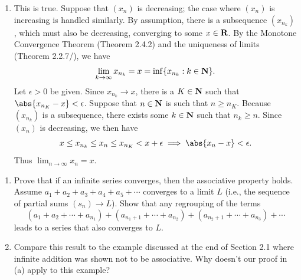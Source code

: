 \documentclass{lew98_solutions}
\begin{document}
\begin{solution}
\begin{enumerate}
        \item This is true. Suppose that \( (x_n) \) is decreasing; the case where \( (x_n) \) is increasing is handled similarly. By assumption, there is a subsequence \( (x_{n_k}) \), which must also be decreasing, converging to some \( x \in \mathbf{R} \). By the Monotone Convergence Theorem (Theorem 2.4.2) and the uniqueness of limits (Theorem 2.2.7/), we have
        \[
            \lim_{k \to \infty} x_{n_k} = x = \inf \{ x_{n_k} : k \in \mathbf{N} \}.
        \]
        Let \( \epsilon > 0 \) be given. Since \( x_{n_k} \to x \), there is a \( K \in \mathbf{N} \) such that \( \abs{x_{n_K} - x} < \epsilon \). Suppose that \( n \in \mathbf{N} \) is such that \( n \geq n_K \). Because \( (x_{n_k}) \) is a subsequence, there exists some \( k \in \mathbf{N} \) such that \( n_k \geq n \). Since \( (x_n) \) is decreasing, we then have
        \[
            x \leq x_{n_k} \leq x_n \leq x_{n_K} < x + \epsilon \implies \abs{x_n - x} < \epsilon.
        \]
        Thus \( \lim_{n \to \infty} x_n = x \).
    \end{enumerate}
\end{solution}

\begin{exercise}
\label{ex:2.5.3}
    \begin{enumerate}
        \item Prove that if an infinite series converges, then the associative property holds. Assume \( a_1 + a_2 + a_3 + a_4 + a_5 + \cdots \) converges to a limit \( L \) (i.e., the sequence of partial sums \( (s_n) \to L \)). Show that any regrouping of the terms
        \[
            (a_1 + a_2 + \cdots + a_{n_1}) + (a_{n_1 + 1} + \cdots + a_{n_2}) + (a_{n_2 + 1} + \cdots + a_{n_3}) + \cdots
        \]
        leads to a series that also converges to \( L \).

        \item Compare this result to the example discussed at the end of Section 2.1 where infinite addition was shown not to be associative. Why doesn't our proof in (a) apply to this example?
    \end{enumerate}
\end{exercise}
\end{document}
